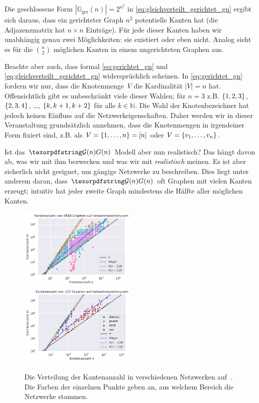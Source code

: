 Die geschlossene Form $| \mathbb G_\text{ger}(n) | = 2^{n^2}$ in \cref{eq:gleichverteilt_gerichtet_gn} ergibt sich daraus, dass ein gerichteter Graph $n^2$ potentielle Kanten hat (die Adjazenzmatrix hat $n \times n$ Einträge).
Für jede dieser Kanten haben wir unabhängig genau zwei Möglichkeiten: sie existiert oder eben nicht.
Analog sieht es für die $\binom n 2$ möglichen Kanten in einem ungerichteten Graphen aus.

Beachte aber auch, dass formal \cref{eq:gerichtet_gn} und \cref{eq:gleichverteilt_gerichtet_gn} widersprüchlich scheinen.
In \cref{eq:gerichtet_gn} fordern wir nur, dass die Knotenmenge~$V$ die Kardinalität $|V| = n$ hat.
Offensichtlich gibt es unbeschränkt viele dieser Wahlen; für $n=3$ z.B. $\left\{1,2,3\right\}$, $\left\{2,3,4\right\}$, \ldots, $\left\{k, k+1, k+2\right\}$ für alle $k \in \mathbb N$.
Die Wahl der Knotenbezeichner hat jedoch keinen Einfluss auf die Netzwerkeigenschaften.
Daher werden wir in dieser Veranstaltung grundsätzlich annehmen, dass die Knotenmengen in irgendeiner Form fixiert sind, z.B. als $V = \left\{1, \ldots, n\right\} = [n]$ oder $V = \left\{v_1, \ldots, v_n\right\}$.

\bigskip

Ist das $\Gn$ Modell aber nun realistisch?
Das hängt davon ab, was wir mit ihm bezwecken und was wir mit \emph{realistisch} meinen.
Es ist aber sicherlich nicht geeignet, um gängige Netzwerke zu beschreiben.
Dies liegt unter anderem daran, dass $\Gn$ oft Graphen mit vielen Kanten erzeugt;
intuitiv hat \glqq jeder zweite Graph\grqq{} mindestens die Hälfte aller möglichen Kanten.

\begin{figure}[t]
    \begin{center}
        \includegraphics[width=0.5\textwidth]{data/network-rep-edges.pdf}%
        \includegraphics[width=0.5\textwidth]{data/network-rep-edges-thin.pdf}%
    \end{center}
    \caption{
        Die Verteilung der Kantenanzahl in verschiedenen Netzwerken auf~\cite{networkrepository}.
        Die Farben der einzelnen Punkte geben an, aus welchem Bereich die Netzwerke stammen.
    }
    \label{fig:kantenanzahl}
\end{figure}


